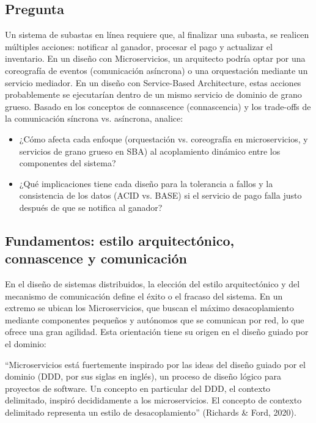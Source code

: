 \documentclass[12pt, a4paper]{article}
\begin{document}
    \subsection{Pregunta}
    Un sistema de subastas en línea requiere que, al finalizar una subasta, se realicen múltiples acciones: notificar al ganador, procesar el pago y actualizar el inventario. En un diseño con Microservicios, un arquitecto podría optar por una coreografía de eventos (comunicación asíncrona) o una orquestación mediante un servicio mediador. En un diseño con Service-Based Architecture, estas acciones probablemente se ejecutarían dentro de un mismo servicio de dominio de grano grueso. Basado en los conceptos de connascence (connascencia) y los trade-offs de la comunicación síncrona vs. asíncrona, analice:

    \begin{itemize}
        \item ¿Cómo afecta cada enfoque (orquestación vs. coreografía en microservicios, y servicios de grano grueso en SBA) al acoplamiento dinámico entre los componentes del sistema?
        \item ¿Qué implicaciones tiene cada diseño para la tolerancia a fallos y la consistencia de los datos (ACID vs. BASE) si el servicio de pago falla justo después de que se notifica al ganador?
    \end{itemize}

    \subsection{Fundamentos: estilo arquitectónico, connascence y comunicación}

    En el diseño de sistemas distribuidos, la elección del estilo arquitectónico y del mecanismo de comunicación define el éxito o el fracaso del sistema. En un extremo se ubican los Microservicios, que buscan el máximo desacoplamiento mediante componentes pequeños y autónomos que se comunican por red, lo que ofrece una gran agilidad. Esta orientación tiene su origen en el diseño guiado por el dominio:

    “Microservicios está fuertemente inspirado por las ideas del diseño guiado por el dominio (DDD, por sus siglas en inglés), un proceso de diseño lógico para proyectos de software. Un concepto en particular del DDD, el contexto delimitado, inspiró decididamente a los microservicios. El concepto de contexto delimitado representa un estilo de desacoplamiento” (Richards \& Ford, 2020).
\end{document}
